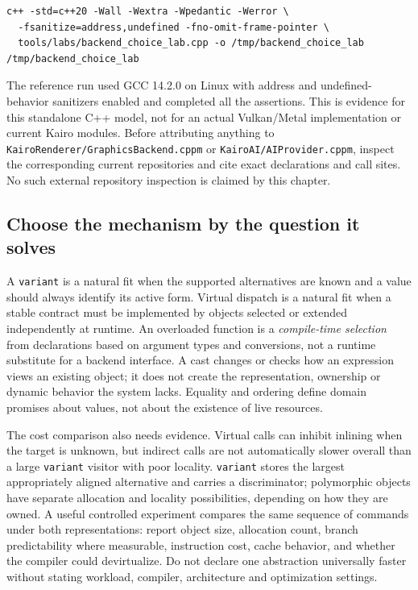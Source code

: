\begin{verbatim}
c++ -std=c++20 -Wall -Wextra -Wpedantic -Werror \
  -fsanitize=address,undefined -fno-omit-frame-pointer \
  tools/labs/backend_choice_lab.cpp -o /tmp/backend_choice_lab
/tmp/backend_choice_lab
\end{verbatim}

The reference run used GCC 14.2.0 on Linux with address and undefined-behavior sanitizers enabled and completed all the assertions. This is evidence for this standalone C++ model, not for an actual Vulkan/Metal implementation or current Kairo modules. Before attributing anything to \texttt{KairoRenderer/GraphicsBackend.cppm} or \texttt{KairoAI/AIProvider.cppm}, inspect the corresponding current repositories and cite exact declarations and call sites. No such external repository inspection is claimed by this chapter.

\subsection{Choose the mechanism by the question it solves}\label{05-engine-i-ch004-choose-the-mechanism-by-the-question-it-solves}

A \texttt{variant} is a natural fit when the supported alternatives are known and a value should always identify its active form. Virtual dispatch is a natural fit when a stable contract must be implemented by objects selected or extended independently at runtime. An overloaded function is a \emph{compile-time selection} from declarations based on argument types and conversions, not a runtime substitute for a backend interface. A cast changes or checks how an expression views an existing object; it does not create the representation, ownership or dynamic behavior the system lacks. Equality and ordering define domain promises about values, not about the existence of live resources.

The cost comparison also needs evidence. Virtual calls can inhibit inlining when the target is unknown, but indirect calls are not automatically slower overall than a large \texttt{variant} visitor with poor locality. \texttt{variant} stores the largest appropriately aligned alternative and carries a discriminator; polymorphic objects have separate allocation and locality possibilities, depending on how they are owned. A useful controlled experiment compares the same sequence of commands under both representations: report object size, allocation count, branch predictability where measurable, instruction cost, cache behavior, and whether the compiler could devirtualize. Do not declare one abstraction universally faster without stating workload, compiler, architecture and optimization settings.

